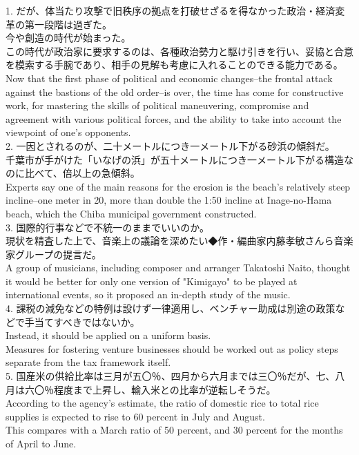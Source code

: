 1. だが、体当たり攻撃で旧秩序の拠点を打破せざるを得なかった政治・経済変革の第一段階は過ぎた。\\
今や創造の時代が始まった。\\
この時代が政治家に要求するのは、各種政治勢力と駆け引きを行い、妥協と合意を模索する手腕であり、相手の見解も考慮に入れることのできる能力である。\\
Now that the first phase of political and economic changes--the frontal attack against the bastions of the old order--is over, the time has come for constructive work, for mastering the skills of political maneuvering, compromise and agreement with various political forces, and the ability to take into account the viewpoint of one's opponents. \\

2. 一因とされるのが、二十メートルにつき一メートル下がる砂浜の傾斜だ。\\
千葉市が手がけた「いなげの浜」が五十メートルにつき一メートル下がる構造なのに比べて、倍以上の急傾斜。\\
Experts say one of the main reasons for the erosion is the beach's relatively steep incline--one meter in 20, more than double the 1:50 incline at Inage-no-Hama beach, which the Chiba municipal government constructed. \\

3. 国際的行事などで不統一のままでいいのか。\\
現状を精査した上で、音楽上の議論を深めたい◆作・編曲家内藤孝敏さんら音楽家グループの提言だ。\\
A group of musicians, including composer and arranger Takatoshi Naito, thought it would be better for only one version of "Kimigayo" to be played at international events, so it proposed an in-depth study of the music. \\

4. 課税の減免などの特例は設けず一律適用し、ベンチャー助成は別途の政策などで手当てすべきではないか。\\
Instead, it should be applied on a uniform basis. \\
Measures for fostering venture businesses should be worked out as policy steps separate from the tax framework itself. \\

5. 国産米の供給比率は三月が五〇％、四月から六月までは三〇％だが、七、八月は六〇％程度まで上昇し、輸入米との比率が逆転しそうだ。\\
According to the agency's estimate, the ratio of domestic rice to total rice supplies is expected to rise to 60 percent in July and August. \\
This compares with a March ratio of 50 percent, and 30 percent for the months of April to June. \\

